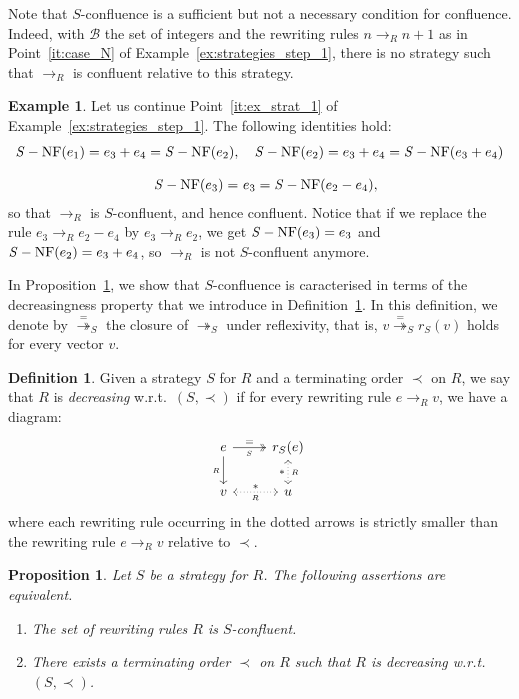 \documentclass[10pt]{easychair}
\newtheorem{proposition}[theorem]{Proposition}
\theoremstyle{definition}
\newtheorem{definition}[theorem]{Definition}
\newtheorem{example}[theorem]{Example}
\newcommand\basis{\mathscr{B}}
\newcommand\rewR{\to_R}
\newcommand\parS{\twoheadrightarrow_S}
\DeclareMathOperator{\SNF}{{\it S}-NF}
\begin{document}
Note that $S$-confluence is a sufficient but not a necessary condition for
confluence. Indeed, with $\basis$ the set of integers and the rewriting rules
$n\rewR n+1$ as in Point~\ref{it:case_N} of
Example~\ref{ex:strategies_step_1}, there is no strategy such that
$\rewR$ is confluent relative to this strategy. 
\smallskip

\begin{example}\label{ex:S-conf}
  Let us continue Point~\ref{it:ex_strat_1} of
  Example~\ref{ex:strategies_step_1}. The following identities hold:
  \[\begin{split}
  \SNF(e_1)=e_3+e_4=\SNF(e_2),&\quad\SNF(e_2)=e_3+e_4=\SNF(e_3+e_4)
  \\[0.3cm]
  \SNF(e_3)=& \ e_3=\SNF(e_2-e_4),
  \end{split}
  \smallskip\]
  so that $\rewR$ is $S$-confluent, and hence confluent. Notice that if
  we replace the rule $e_3\rewR e_2-e_4$ by $e_3\rewR e_2$, we get
  $\SNF(e_3)=e_3$ and $\SNF(e_2)=e_3+e_4$, so $\rewR$ is not
  $S$-confluent anymore. 
\end{example}
\smallskip

In Proposition~\ref{prop:S-conf_decreasing}, we show that $S$-confluence
is caracterised in terms of the decreasingness property that we introduce
in Definition~\ref{def:decreasing}. In this definition, we denote by
$\overset{=}{\twoheadrightarrow}_S$ the closure of $\parS$ under
reflexivity, that is, $v\overset{=}{\twoheadrightarrow}_Sr_S(v)$ holds 
for every vector $v$.
\smallskip

\begin{definition}\label{def:decreasing}
  Given a strategy $S$ for $R$ and a terminating order $\prec$ on $R$, we
  say that $R$ is {\em decreasing} w.r.t.\ $(S,\prec)$ if for every
  rewriting rule $e\rewR v$, we have a diagram:
  \[\begin{tikzcd}
      e\ar[d, "_R"']\ar[r, twoheadrightarrow, "=", "_S"'] &
      r_S(e)\ar[d, leftrightarrow, dotted, "*"', "_R"]\\
      v\ar[r, leftrightarrow, dotted, "*", "_R"'] & u
    \end{tikzcd}\]
  where each rewriting rule occurring in the dotted arrows is strictly
  smaller than the rewriting rule $e\rewR v$ relative to $\prec$.
\end{definition}
\smallskip

\begin{proposition}\label{prop:S-conf_decreasing}
  Let $S$ be a strategy for $R$. The following assertions are equivalent.
  \begin{enumerate}
  \item The set of rewriting rules $R$ is $S$-confluent.
  \item There exists a terminating order $\prec$ on $R$ such that $R$ is
    decreasing w.r.t.\ $(S,\prec)$.
  \end{enumerate}
\end{proposition}
\end{document}

